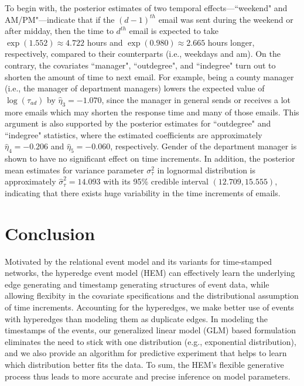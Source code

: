 \documentclass[ba]{imsart}
\numberwithin{equation}{section}
\theoremstyle{plain}
\begin{document}
	To begin with, the posterior estimates of two temporal effects---``weekend" and 		AM/PM"---indicate that if the ${(d-1)}^{th}$ email was sent during the weekend or after midday, then the time to $d^{th}$ email is expected to take $\exp(1.552)\approx 4.722$ hours and $\exp(0.980)\approx2.665$ hours longer, respectively, compared to their counterparts (i.e., weekdays and am). On the contrary, the covariates ``manager", ``outdegree", and ``indegree" turn out to shorten the amount of time to next email. For example, being a county manager (i.e., the manager of department managers) lowers the expected value of $\log(\tau_{ad})$ by $\hat{\eta}_3 = -1.070$, since the manager in general sends or receives a lot more emails which may shorten the response time and many of those emails. This argument is also supported by the posterior estimates for ``outdegree" and ``indegree" statistics, where the estimated coefficients are approximately $\hat{\eta}_4=-0.206$ and $\hat{\eta}_5=-0.060$, respectively. Gender of the department manager is shown to have no significant effect on time increments. In addition, the posterior mean estimates for variance parameter $\sigma^2_\tau$ in lognormal distribution is approximately $\hat{\sigma}^2_\tau=14.093$ with its 95\% credible interval $(12.709, 15.555)$, indicating that there exists huge variability in the time increments of emails.
	
\section{Conclusion}\label{sec:conclusion}
Motivated by the relational event model \citep{Butts2008} and its variants for time-stamped networks, the hyperedge event model (HEM) can effectively learn the underlying edge generating and timestamp generating structures of event data, while allowing flexibity in the covariate specifications and the distributional assumption of time increments.
Accounting for the hyperedges, we make better use of events with hyperedges than modeling them as duplicate edges. In modeling the timestamps of the events, our generalized linear model (GLM) based formulation eliminates the need to stick with one distribution (e.g., exponential distribution), and we also provide an algorithm for predictive experiment that helps to learn which distribution better fits the data. To sum, the HEM's flexible generative process thus leads to more accurate and precise inference on model parameters.
\end{document}
